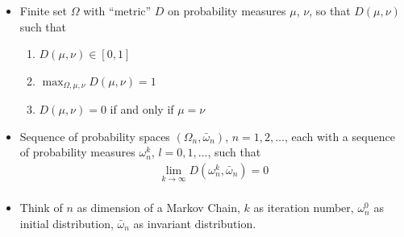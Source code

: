 \documentclass[dvips,landscape]{foils}
\begin{document}
  \begin{itemize}\setlength{\parskip}{0pt}  \setlength{\itemsep}{5pt} \setlength{\topsep}{0pt}
  \item Finite set $\Omega$ with ``metric'' $D$ on
    probability measures $\mu$, $\nu$, so that
    $D(\mu,\nu)$ such that 
    \begin{enumerate}
    \item $D(\mu,\nu)\in [0,1]$
    \item $\max_{\Omega,\mu,\nu} D(\mu,\nu) = 1$
    \item $D(\mu,\nu)=0$ if and only if $\mu=\nu$
    \end{enumerate}
  \item Sequence of probability spaces $(\Omega_n, \bar{\omega}_n)$,
    $n=1,2,\ldots$, each with a sequence of probability measures
    $\omega^k_n$, $l=0,1,\ldots$, such that
    \begin{align*}
      \lim_{k \rightarrow \infty} D(\omega^k_n,\bar{\omega}_n)=0
      \\[-1.6cm]
    \end{align*}
  \item Think of $n$ as dimension of a Markov Chain, $k$ as iteration
    number, $\omega^0_n$ as initial distribution, $\bar{\omega}_n$ as invariant
    distribution.
  \end{itemize}
\end{document}
